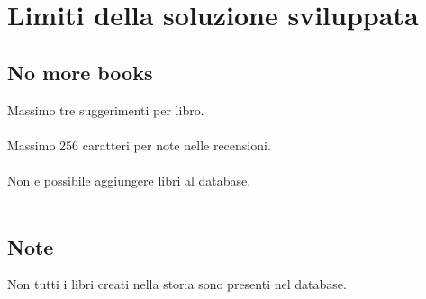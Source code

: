 \documentclass{report}
\begin{document}
\chapter{Limiti della soluzione sviluppata}
\section{No more books}
Massimo tre suggerimenti per libro. \\ \\
Massimo 256 caratteri per note nelle recensioni. \\ \\
Non e possibile aggiungere libri al database. \\ \\ %
\section{Note}
Non tutti i libri creati nella storia sono presenti nel database. 
\end{document}
